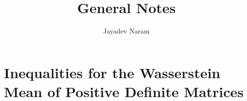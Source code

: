 \documentclass[11pt,a4paper]{article}
\author{Jayadev Naram}
\title{General Notes}
\begin{document}
\date{}
\maketitle
\tableofcontents
\newpage

\theoremstyle{plain}
\newtheorem{theorem}{Theorem}[section]
\newtheorem{corollary}{Corollary}[theorem]

\newtheorem{lemma}[theorem]{Lemma}
\newtheorem{proposition}[theorem]{Proposition}
\newtheorem{assume}{Assumption}

\theoremstyle{definition}
\newtheorem{definition}[theorem]{Definition}
\newtheorem{example}[theorem]{Example}
\newtheorem{remark}[theorem]{Remark}

\newcommand{\R}{\mathbb{R}}
\newcommand{\B}{\mathbb{B}}
\newcommand{\A}{\mathcal{A}}
\newcommand{\M}{\mathcal{M}}
\newcommand{\N}{\mathcal{N}}
\newcommand{\h}{\mathcal{H}}
\newcommand{\T}{\mathcal{T}}
\newcommand{\Pspace}{\mathbb{P}}
\newcommand{\Dist}{\mathcal{D}}
\newcommand{\perpProj}{\mathcal{P}^\perp}
\newcommand{\bb}{\mathbb{B}}
\newcommand{\Sprod}{\mathbb{S}_{xy}}
\newcommand{\highlight}[1]{\underline{\textit{\textbf{#1}}}}
\newcommand{\mapping}[3]{#1:#2\rightarrow #3}
\newcommand{\doubt}{\highlight{[??]}}
\newcommand{\bigvert}[2]{\left.#1\right|_{#2}}
\newcommand{\sdnn}[1]{${#1}$}
\newcommand{\bsdnn}[1]{$\boldsymbol{#1}$}
\newcommand{\ifthen}[2]{\textbf{(#1)}\boldsymbol{\implies}\textbf{(#2)}}
\newcommand{\bsdn}[1]{\boldsymbol{#1}}
\newcommand{\forward}{$(\implies)$\ }
\newcommand{\converse}{$(\impliedby)$\ }
\newcommand{\Lt}[1]{\underset{#1\rightarrow 0}{Lt}}
\newcommand{\norm}[1]{\|#1\|}
\newcommand{\dparder}[2]{\dfrac{\partial #1}{\partial x_{#2}}}
\newcommand{\fparder}[2]{\frac{\partial #1}{\partial x_{#2}}}
\newcommand{\parder}[2]{\partial #1/\partial x_{#2}}
\newcommand{\parop}[1]{\dfrac{\partial}{\partial x_{#1}}}
\newcommand{\innerproduct}[2]{\langle #1, #2 \rangle}
\newcommand{\metric}[2]{[#1, #2]}
\newcommand{\genst}{St_B(n,p)}
\newcommand{\igenst}[1]{St_{B_{#1}}(n_{#1},p)}
\newcommand{\realmat}[2]{\R^{#1\times #2}}
\newcommand{\Skew}{\mathcal{S}_{skew}(p)}
\newcommand{\Sym}{\mathcal{S}_{sym}(p)}
\newcommand{\XperpB}{X_{B^\perp}}
\newcommand{\polarRetr}{R^{polar}_X}
\newcommand{\qrRetr}{R^{QR}_X}
\newcommand{\vectransport}{\mathcal{T}}
\newcommand{\grad}{\mathrm{grad}\,}
\newcommand{\hess}{\mathrm{Hess}\,}
\newcommand{\trace}{\mathrm{tr}}

\section{Inequalities for the Wasserstein Mean of Positive Definite Matrices}
\end{document}
